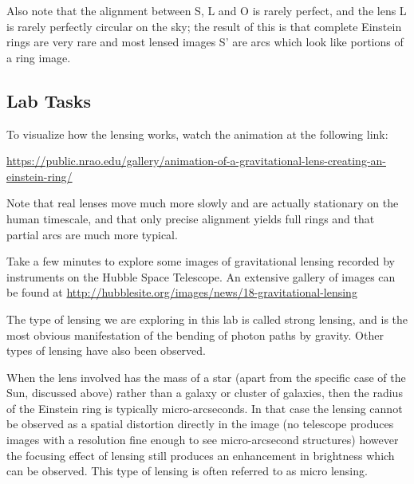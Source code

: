 Also note that the alignment between S, L and O is rarely perfect, and
the lens L is rarely perfectly circular on the sky; the result of this
is that complete Einstein rings are very rare and most lensed images
S' are arcs which look like portions of a ring image. 

\subsection*{Lab Tasks}

\begin{steps}
	\item To visualize how the lensing works, watch the animation at the following link:
\begin{framed} \url{https://public.nrao.edu/gallery/animation-of-a-gravitational-lens-creating-an-einstein-ring/}
\end{framed}
	Note that real lenses move much more slowly and are actually stationary on the human timescale, and that only
	precise alignment yields full rings and that partial arcs are much
	more typical.
	
	\item Take a few minutes to explore some images of
	gravitational lensing recorded by instruments on the Hubble Space
	Telescope. An extensive gallery of images can be found at \url{http://hubblesite.org/images/news/18-gravitational-lensing}
	
\end{steps}

The type of lensing we are exploring in this lab is called strong
lensing, and is the most obvious manifestation of the bending of
photon paths by gravity. Other types of lensing have also been observed.

When the lens involved has the mass of a star (apart from the specific
case of the Sun, discussed above) rather than a galaxy or cluster of
galaxies, then the radius of the Einstein ring is typically
micro-arcseconds. In that case the lensing cannot be observed as a
spatial distortion directly in the image (no telescope produces
images with a resolution fine enough to see micro-arcsecond
structures) however the focusing effect of lensing still produces an
enhancement in brightness which can be observed. This type of lensing
is often referred to as micro lensing.

